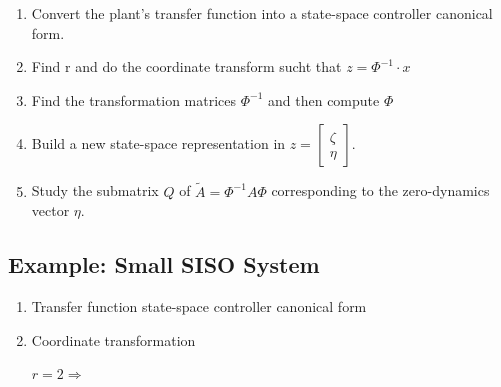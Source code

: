 \documentclass[10pt,a4paper]{scrartcl}
\begin{document}
\begin{multicols*}{3}
\begin{enumerate}
\ncompaq
\item Convert the plant's transfer function into a state-space controller canonical form.
\item Find r and do the coordinate transform sucht that $z=\Phi^{-1}\cdot x$
\item Find the transformation matrices $\Phi^{-1}$ and then compute $\Phi$
\item Build a new state-space representation in $z=\begin{bmatrix}\zeta\\\eta\end{bmatrix}$.
\item Study the submatrix $Q$ of $\tilde{A}=\Phi^{-1}A\Phi$ corresponding to the zero-dynamics vector $\eta$. 
\end{enumerate}

\subsection{Example: Small SISO System}

\begin{enumerate}[leftmargin=*]
\ncompaq
\item Transfer function \dahe state-space controller canonical form
\item Coordinate transformation

$r=2\Longrightarrow$



\end{enumerate}
\end{multicols*}
\end{document}
